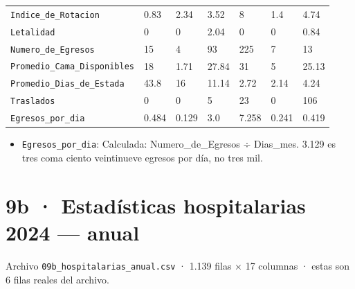 \documentclass[10pt]{article}
\begin{document}
\begin{xltabular}{\linewidth}{@{}p{4.3cm} Y Y Y Y Y Y @{}}
\texttt{Indice\_\allowbreak{}de\_\allowbreak{}Rotacion} & 0.83 & 2.34 & 3.52 & 8 & 1.4 & 4.74 \\
\texttt{Letalidad} & 0 & 0 & 2.04 & 0 & 0 & 0.84 \\
\texttt{Numero\_\allowbreak{}de\_\allowbreak{}Egresos} & 15 & 4 & 93 & 225 & 7 & 13 \\
\texttt{Promedio\_\allowbreak{}Cama\_\allowbreak{}Disponibles} & 18 & 1.71 & 27.84 & 31 & 5 & 25.13 \\
\texttt{Promedio\_\allowbreak{}Dias\_\allowbreak{}de\_\allowbreak{}Estada} & 43.8 & 16 & 11.14 & 2.72 & 2.14 & 4.24 \\
\texttt{Traslados} & 0 & 0 & 5 & 23 & 0 & 106 \\
\texttt{Egresos\_\allowbreak{}por\_\allowbreak{}dia} & 0.484 & 0.129 & 3.0 & 7.258 & 0.241 & 0.419 \\
\end{xltabular}
\normalsize

\begin{alertabox}
\begin{itemize}[leftmargin=1.4em,itemsep=2pt,topsep=2pt]
\item \texttt{Egresos\_\allowbreak{}por\_\allowbreak{}dia}: Calculada: Numero\_de\_Egresos ÷ Dias\_mes. 3.129 es tres coma ciento veintinueve egresos por día, no tres mil.
\end{itemize}
\end{alertabox}

\clearpage
\hypertarget{base9b}{}
\section{9b · Estadísticas hospitalarias 2024 — anual}
\small Archivo \texttt{09b\_hospitalarias\_anual.csv} · 1.139 filas × 17 columnas · estas son 6 filas reales del archivo.\normalsize
\end{document}
